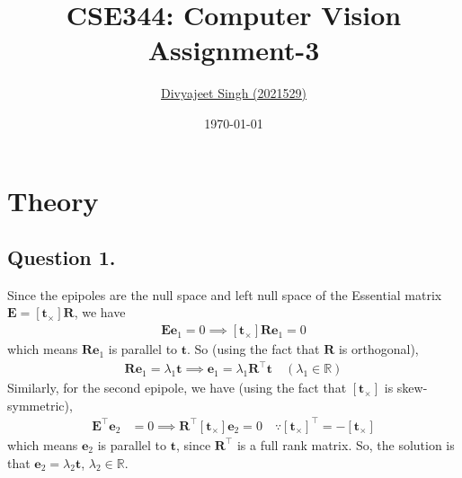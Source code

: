 \documentclass[10pt]{article}
\title{
    \textbf{CSE344: Computer Vision} \\ \vspace*{-5pt}
    \textbf{\large{Assignment-3}}
}
\author{\href{mailto:divyajeet21529@iiitd.ac.in}{Divyajeet Singh (2021529)}}
\date{\today}
\begin{document}
    \maketitle

    \section*{\textbf{Theory}}
    \subsection*{\textbf{Question 1.}}
    Since the epipoles are the null space and left null space of the Essential
    matrix $\mathbf{E} = [\mathbf{t}_{\times}] \mathbf{R}$, we have
    \begin{align*}
        \mathbf{E} \mathbf{e}_{1} = 0
        \implies [\mathbf{t}_{\times}] \mathbf{R} \mathbf{e}_{1} = 0
    \end{align*}
    which means $\mathbf{R} \mathbf{e}_{1}$ is parallel to $\mathbf{t}$. So
    (using the fact that $\mathbf{R}$ is orthogonal),
    \begin{align*}
        \mathbf{R} \mathbf{e}_{1} = \lambda_{1} \mathbf{t}
        \implies \mathbf{e}_{1} = \lambda_{1} \mathbf{R}^{\top} \mathbf{t}
        \quad (\lambda_{1} \in \mathbb{R})
    \end{align*}
    Similarly, for the second epipole, we have (using the fact that $[\mathbf{t}_{\times}]$
    is skew-symmetric),
    \begin{align*}
        \mathbf{E}^{\top} \mathbf{e}_{2} &= 0 \implies \mathbf{R}^{\top} [\mathbf{t}_{\times}] \mathbf{e}_{2} = 0
        \quad \because [\mathbf{t}_{\times}]^{\top} = -[\mathbf{t}_{\times}]
    \end{align*}
    which means $\mathbf{e}_{2}$ is parallel to $\mathbf{t}$, since $\mathbf{R}^{\top}$ is
    a full rank matrix. So, the solution is that $\mathbf{e}_{2} = \lambda_{2} \mathbf{t}$,
    $\lambda_{2} \in \mathbb{R}$.
\end{document}
